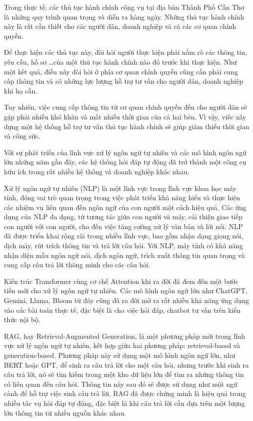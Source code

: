 \documentclass[a4paper, 12pt, openany]{book}
\begin{document}
Trong thực tế, các thủ tục hành chính công vụ tại địa bàn Thành Phố Cần Thơ là những quy trình quan trọng và
diễn ra hàng ngày. Những thủ tục hành chính này là rất cần thiết cho các người dân, doanh nghiệp và cả các
cơ quan chính quyền.

Để thực hiện các thủ tục này, đòi hỏi người thực hiện phải nắm rõ các thông tin, yêu cầu, hồ sơ \dots của một thủ tục hành chính
nào đó trước khi thực hiện. Như một kết quả, điều này đòi hỏi ở phía cơ quan chính quyền cũng cần phải cung cấp thông tin
và có những lực lượng hỗ trợ tư vấn cho người dân, doanh nghiệp khi họ cần.

Tuy nhiên, việc cung cấp thông tin từ cơ quan chính quyền đến cho người dân sẽ gặp phải nhiều khó khăn và mất nhiều thời gian của cả hai bên.
Vì vậy, viêc xây dựng một hệ thống hỗ trợ tư vấn thủ tục hành chính sẽ giúp giảm thiểu thời gian và công sức.

Với sự phát triển của lĩnh vực xử lý ngôn ngữ tự nhiên và các mô hình ngôn ngữ lớn những năm gần đây, 
các hệ thống hỏi đáp tự động đã trở thành một công cụ hữu ích trong rất nhiều hệ thống và doanh nghiệp khác nhau.

Xử lý ngôn ngữ tự nhiên (NLP) là một lĩnh vực trong lĩnh vực khoa học máy tính, đóng vai trò quan trọng trong việc phát triển khả năng hiểu và thực hiện các nhiệm vụ liên quan đến ngôn ngữ của con người một cách hiệu quả. Các ứng dụng của NLP đa dạng, từ tương tác giữa con người và máy, cải thiện giao tiếp con người với con người, cho đến việc tăng cường xử lý văn bản và lời nói. NLP đã được triển khai rộng rãi trong nhiều lĩnh vực, bao gồm nhận dạng giọng nói, dịch máy, rút trích thông tin và trả lời câu hỏi. Với NLP, máy tính có khả năng nhận diện mẫu ngôn ngữ nói, dịch ngôn ngữ, trích xuất thông tin quan trọng và cung cấp câu trả lời thông minh cho các câu hỏi.

Kiến trúc Transformer cùng cơ chế Attention khi ra đời đã đem đến một bước tiến mới cho
xử lý ngôn ngữ tự nhiên. Các mô hình ngôn ngữ lớn như ChatGPT, Gemini, Llama, Bloom từ đây cũng đã ra đời mở ra rất nhiều khả năng ứng dụng vào các bài toán thực tế,
đặc biệt là cho việc hỏi đáp, chatbot tư vấn trên kiến thức nội bộ.

RAG, hay Retrieval-Augmented Generation, là một phương pháp mới trong lĩnh vực xử lý ngôn ngữ tự nhiên, kết hợp giữa hai phương pháp: retrieval-based và generation-based. 
Phương pháp này sử dụng một mô hình ngôn ngữ lớn, như BERT hoặc GPT, để sinh ra câu trả lời cho một câu hỏi, nhưng trước khi sinh ra câu trả lời, nó sẽ tìm kiếm trong một kho dữ liệu lớn để tìm ra những thông tin có liên quan đến câu hỏi. Thông tin này sau đó sẽ được sử dụng như một ngữ cảnh để hỗ trợ việc sinh câu trả lời.
RAG đã được chứng minh là hiệu quả trong nhiều tác vụ hỏi đáp tự động, đặc biệt là khi câu trả lời cần dựa trên một lượng lớn thông tin từ nhiều nguồn khác nhau. 
\end{document}
